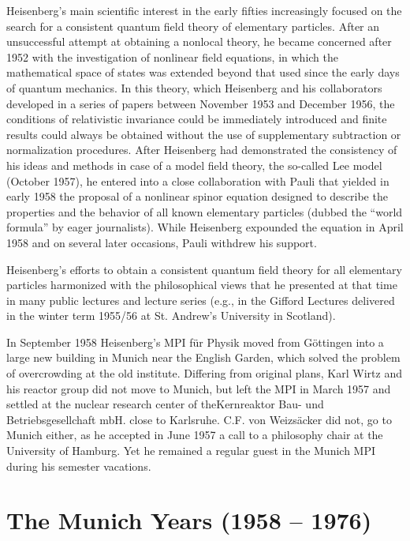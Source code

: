 \documentclass{article}
\begin{document}
Heisenberg's main scientific interest in the early fifties increasingly focused on the search for a consistent quantum field theory of elementary particles. After an unsuccessful attempt at obtaining a nonlocal theory, he became concerned after 1952 with the investigation of nonlinear field equations, in which the mathematical space of states was extended beyond that used since the early days of quantum mechanics. In this theory, which Heisenberg and his collaborators developed in a series of papers between November 1953 and December 1956, the conditions of relativistic invariance could be immediately introduced and finite results could always be obtained without the use of supplementary subtraction or normalization procedures. After Heisenberg had demonstrated the consistency of his ideas and methods in case of a model field theory, the so-called Lee model (October 1957), he entered into a close collaboration with Pauli that yielded in early 1958 the proposal of a nonlinear spinor equation designed to describe the properties and the behavior of all known elementary particles (dubbed the “world formula” by eager journalists). While Heisenberg expounded the equation in April 1958 and on several later occasions, Pauli withdrew his support.

Heisenberg's efforts to obtain a consistent quantum field theory for all elementary particles harmonized with the philosophical views that he presented at that time in many public lectures and lecture series (e.g., in the Gifford Lectures delivered in the winter term 1955/56 at St. Andrew's University in Scotland).

In September 1958 Heisenberg's MPI für Physik moved from Göttingen into a large new building in Munich near the English Garden, which solved the problem of overcrowding at the old institute. Differing from original plans, Karl Wirtz and his reactor group did not move to Munich, but left the MPI in March 1957 and settled at the nuclear research center of theKernreaktor Bau- und Betriebsgesellchaft mbH. close to Karlsruhe. C.F. von Weizsäcker did not, go to Munich either, as he accepted in June 1957 a call to a philosophy chair at the University of Hamburg. Yet he remained a regular guest in the Munich MPI during his semester vacations.

\section{The Munich Years (1958 – 1976)}
\end{document}
